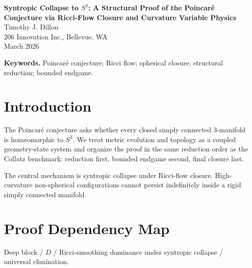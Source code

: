 \documentclass[11pt]{article}
\theoremstyle{definition}
\begin{document}
\begin{center}
{\LARGE \textbf{Syntropic Collapse to $S^3$: A Structural Proof of the Poincar\'e Conjecture via Ricci-Flow Closure and Curvature Variable Physics}}\\[0.85em]
{\large Timothy J. Dillon}\\
206 Innovation Inc., Bellevue, WA\\
March 2026
\end{center}

\begin{abstract}
We study the Poincar\'e conjecture through a structural reformulation in which the Ricci evolution of a closed simply connected $3$-manifold proceeds within an admissible curvature-closure geometry governed by syntropic collapse, rigidity-wall exclusion of singular drift, and incompatibility of persistent non-spherical topology. We present a reduction-and-closure proof based on deep-regime Ricci-smoothing dominance, segment-model exclusion of non-spherical templates, shallow-fragmentation control, bounded near-critical core analysis, and final incompatibility of all residual candidate non-spherical states. The full argument reduces hypothetical non-spherical behavior to deep, segment-critical, shallow-return, and near-critical families, then eliminates each family in turn. Consequently every admissible closed simply connected $3$-manifold is homeomorphic to $S^3$.
\end{abstract}

\noindent\textbf{Keywords.} Poincaré conjecture; Ricci flow; spherical closure; structural reduction; bounded endgame.

\section{Introduction}
The Poincar\'e conjecture asks whether every closed simply connected $3$-manifold is homeomorphic to $S^3$. We treat metric evolution and topology as a coupled geometry-state system and organize the proof in the same reduction order as the Collatz benchmark: reduction first, bounded endgame second, final closure last.

The central mechanism is syntropic collapse under Ricci-flow closure. High-curvature non-spherical configurations cannot persist indefinitely inside a rigid simply connected manifold.
\section{Proof Dependency Map}
Deep block / $D$ / Ricci-smoothing dominance under syntropic collapse / universal elimination.
\end{document}
